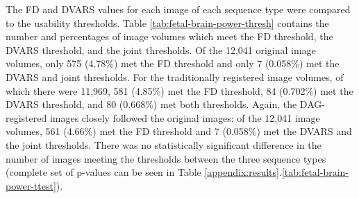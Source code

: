 The FD and DVARS values for each image of each sequence type were compared to the usability thresholds. Table \ref{tab:fetal-brain-power-thresh} contains the number and percentages of image volumes which meet the FD threshold, the DVARS threshold, and the joint thresholds. Of the 12,041 original image volumes, only 575 (4.78\%) met the FD threshold and only 7 (0.058\%) met the DVARS and joint thresholds. For the traditionally registered image volumes, of which there were 11,969, 581 (4.85\%) met the FD threshold, 84 (0.702\%) met the DVARS threshold, and 80 (0.668\%) met both thresholds. Again, the DAG-registered images closely followed the original images: of the 12,041 image volumes, 561 (4.66\%) met the FD threshold and 7 (0.058\%) met the DVARS and the joint thresholds. There was no statistically significant difference in the number of images meeting the thresholds between the three sequence types (complete set of p-values can be seen in Table \ref{appendix:results}.\ref{tab:fetal-brain-power-ttest}).


